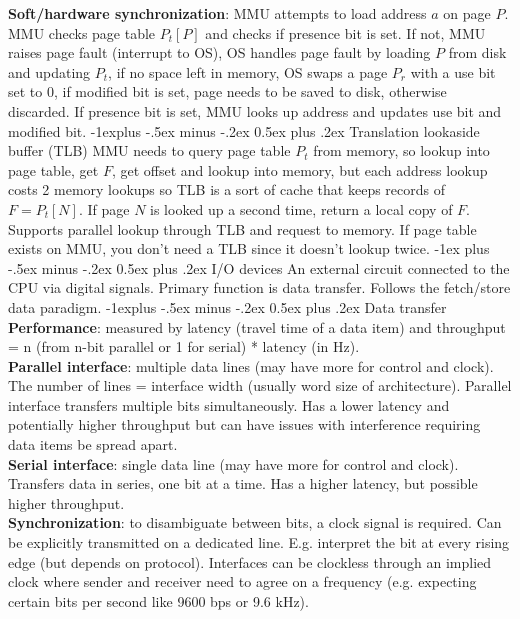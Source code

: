 \documentclass[10pt,landscape]{article}
\makeatletter
\renewcommand{\section}{\@startsection{section}{1}{0mm}%
                                {-1ex plus -.5ex minus -.2ex}%
                                {0.5ex plus .2ex}%
                                {\normalfont\scriptsize\bfseries}}
\renewcommand{\subsection}{\@startsection{subsection}{2}{0mm}%
                                {-1explus -.5ex minus -.2ex}%
                                {0.5ex plus .2ex}%
                                {\normalfont\scriptsize\bfseries}}
\makeatother
\begin{document}
\begin{multicols}{3}
\textbf{Soft/hardware synchronization}: MMU attempts to load address $a$ on page $P$. MMU checks page table $P_t[P]$ and checks if presence bit is set. If not, MMU raises page fault (interrupt to OS), OS handles page fault by loading $P$ from disk and updating $P_t$, if no space left in memory, OS swaps a page $P_r$ with a use bit set to 0, if modified bit is set, page needs to be saved to disk, otherwise discarded. If presence bit is set, MMU looks up address and updates use bit and modified bit.
\subsection{Translation lookaside buffer (TLB)}
MMU needs to query page table $P_t$ from memory, so lookup into page table, get $F$, get offset and lookup into memory, but each address lookup costs 2 memory lookups so TLB is a sort of cache that keeps records of $F=P_t[N]$. If page $N$ is looked up a second time, return a local copy of $F$. Supports parallel lookup through TLB and request to memory. If page table exists on MMU, you don't need a TLB since it doesn't lookup twice. 
\section{I/O devices}
An external circuit connected to the CPU via digital signals. Primary function is data transfer. Follows the fetch/store data paradigm.
\subsection{Data transfer}
\textbf{Performance}: measured by latency (travel time of a data item) and throughput = n (from n-bit parallel or 1 for serial) * latency (in Hz).\\
\textbf{Parallel interface}: multiple data lines (may have more for control and clock). The number of lines = interface width (usually word size of architecture). Parallel interface transfers multiple bits simultaneously. Has a lower latency and potentially higher throughput but can have issues with interference requiring data items be spread apart.\\
\textbf{Serial interface}: single data line (may have more for control and clock). Transfers data in series, one bit at a time. Has a higher latency, but possible higher throughput.\\
\textbf{Synchronization}: to disambiguate between bits, a clock signal is required. Can be explicitly transmitted on a dedicated line. E.g. interpret the bit at every rising edge (but depends on protocol). Interfaces can be clockless through an implied clock where sender and receiver need to agree on a frequency (e.g. expecting certain bits per second like 9600 bps or 9.6 kHz). 

\end{multicols}
\end{document}
